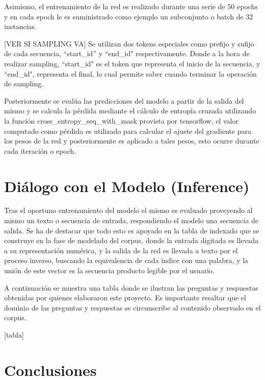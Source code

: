 \documentclass[12pt, letterpaper]{article}
\begin{document}
        Asimismo, el entrenamiento de la red es realizado durante una serie de 50 epochs y en cada epoch le es suministrado como ejemplo un subconjunto o batch de 32 instancias. 
        
        [VER SI SAMPLING VA]
        Se utilizan dos tokens especiales como prefijo y sufijo de cada secuencia, “start\_id” y “end\_id" respectivamente. Donde a la hora de realizar sampling, “start\_id" es el token que representa el inicio de la secuencia, y “end\_id", representa el final, lo cual permite saber cuando terminar la operación de sampling.
        
        Posteriormente se evalúa las predicciones del modelo a partir de la salida del mismo y se calcula la pérdida mediante el cálculo de entropía cruzada utilizando la función cross\_entropy\_seq\_with\_mask provista por tensorflow, el valor computado como pérdida es utilizado para calcular el ajuste del gradiente para los pesos de la red y posteriormente es aplicado a tales pesos, esto ocurre durante cada iteración o epoch.

    \section{Diálogo con el Modelo (Inference)}
        Tras el oportuno entrenamiento del modelo el mismo es evaluado proveyendo al mismo un texto o secuencia de entrada, respondiendo el modelo una secuencia de salida. Se ha de destacar que todo esto es apoyado en la tabla de indexado que se construye en la fase de modelado del corpus, donde la entrada digitada es llevada a su representación numérica, y la salida de la red es llevada a texto por el proceso inverso, buscando la equivalencia de cada índice con una palabra, y la unión de este vector es la secuencia producto legible por el usuario.
        
        A continuación se muestra una tabla donde se ilustran las preguntas y respuestas obtenidas por quienes elaboraron este proyecto. Es importante resaltar que el dominio de las preguntas y respuestas se circunscribe al contenido observado en el corpus.

    [tabla]

    \section{Conclusiones}

    \pagebreak
    \printbibliography[title={Bibliografía}]
\end{document}
